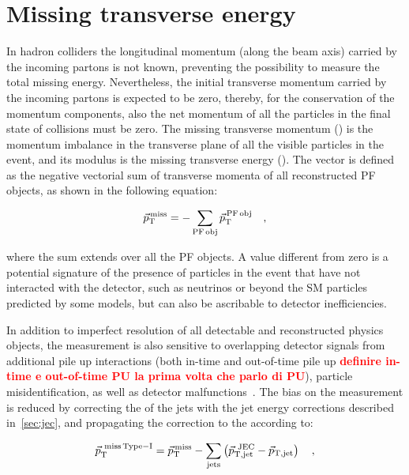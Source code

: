 \section{Missing transverse energy}\label{sec:met}

In hadron colliders the longitudinal momentum (along the beam axis) carried by the incoming partons is not known, preventing the possibility to measure the total missing energy. Nevertheless, the initial transverse momentum carried by the incoming partons is expected to be zero, thereby, for the conservation of the momentum components, also the net momentum of all the particles in the final state of collisions must be zero. The missing transverse momentum (\ptmiss) is the momentum imbalance in the transverse plane of all the visible particles in the event, and its modulus is the missing transverse energy (\MET). The \ptmiss vector is defined as the negative vectorial sum of transverse momenta of all reconstructed PF objects, as shown in the following equation:

\begin{equation}\label{eq:met}
\vec{p}_\mathrm{T}^\mathrm{\,miss} = - \sum_{\mathrm{PF\,obj}} \vec{p}_\mathrm{T}^\mathrm{\,PF\,obj} \quad,
\end{equation}

where the sum extends over all the PF objects.
A \MET value different from zero is a potential signature of the presence of particles in the event that have not interacted with the detector, such as neutrinos or beyond the SM particles predicted by some models, but can also be ascribable to detector inefficiencies.

In addition to imperfect resolution of all detectable and reconstructed physics objects, the \MET measurement is also sensitive to overlapping detector signals from additional pile up interactions (both in-time and out-of-time pile up \textcolor{red}{\bfseries definire in-time e out-of-time PU la prima volta che parlo di PU}),  particle  misidentification,  as  well  as  detector  malfunctions~\cite{CMS-PAS-JME-12-002,CMS-PAS-JME-16-004}.
The bias on the \MET measurement is reduced by correcting the \pt of the jets with the jet energy corrections described in~\ref{sec:jec}, and propagating the correction to the \MET according to:

\begin{equation}
\vec{p}_\mathrm{T}^\mathrm{~miss\,Type-I} = \vec{p}_\mathrm{T}^\mathrm{\,miss} - \sum_\mathrm{jets} \left( \vec{p}_\mathrm{T,jet}^\mathrm{~JEC} - \vec{p}_\mathrm{T,jet}  \right) \quad ,
\end{equation}

